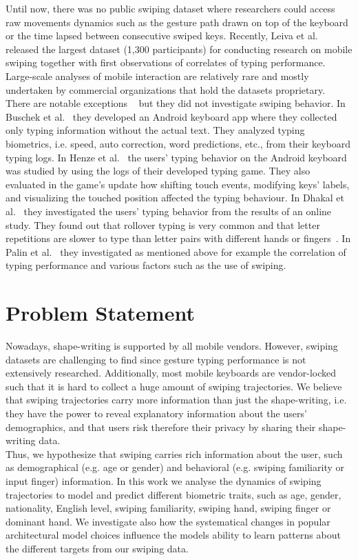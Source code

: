 \documentclass[11pt,oneside,a4paper,openright]{book}
\begin{document}
Until now, there was no public swiping dataset where researchers could access raw movements dynamics such as the gesture path drawn on top of the keyboard or the time lapsed between consecutive swiped keys. Recently, Leiva et al.~\cite{Leiva21_swipe} released the largest dataset (1,300 participants) for conducting research on mobile swiping together with first observations of correlates of typing performance. Large-scale analyses of mobile interaction are relatively rare and mostly undertaken by commercial organizations that hold the datasets proprietary. There are notable exceptions ~\cite{Buschek18, Henze12, Dhakal18, Palin19} but they did not investigate swiping behavior. In Buschek et al.~\cite{Buschek18} they developed an Android keyboard app where they collected only typing information without the actual text. They analyzed typing biometrics, i.e. speed, auto correction, word predictions, etc., from their keyboard typing logs. In Henze et al.~\cite{Henze12} the users' typing behavior on the Android keyboard was studied by using the logs of their developed typing game. They also evaluated in the game's update how shifting touch events, modifying keys' labels, and visualizing the touched position affected the typing behaviour. In Dhakal et al.~\cite{Dhakal18} they investigated the users' typing behavior from the results of an online study. They found out that rollover typing is very common and that letter repetitions are slower to type than letter pairs with different hands or fingers~\cite{Dhakal18}. In Palin et al.~\cite{Palin19} they investigated as mentioned above for example the correlation of typing performance and various factors such as the use of swiping.\newpage

\section{Problem Statement}
Nowadays, shape-writing is supported by all mobile vendors. However, swiping datasets are challenging to find since gesture typing performance is not extensively researched. Additionally, most mobile keyboards are vendor-locked such that it is hard to collect a huge amount of swiping trajectories. We believe that swiping trajectories carry more information than just the shape-writing, i.e. they have the power to reveal explanatory information about the users’ demographics, and that users risk therefore their privacy by sharing their shape-writing data.\\

Thus, we hypothesize that swiping carries rich information about the user, such as demographical (e.g. age or gender) and behavioral (e.g. swiping familiarity or input finger) information. In this work we analyse the dynamics of swiping trajectories to model and predict different biometric traits, such as age, gender, nationality, English level, swiping familiarity, swiping hand, swiping finger or dominant hand. We investigate also how the systematical changes in popular architectural model choices influence the models ability to learn patterns about the different targets from our swiping data.
\end{document}
